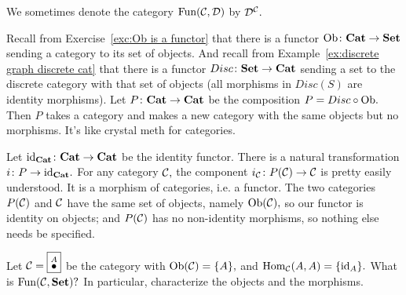 \documentclass[CT4S-EN-RU]{subfiles}
\begin{document}
\begin{proofRUS}
\end{proofRUS}

\begin{notationENG}
We sometimes denote the category $\textnormal{Fun}(\mathcal{C},\mathcal{D})$ by $\mathcal{D}^\mathcal{C}.$ 
\end{notationENG}

\begin{notationRUS}
\end{notationRUS}

\begin{exampleENG}
Recall from Exercise~\ref{exc:Ob is a functor} that there is a functor $\textnormal{Ob}\colon{\mathbf{Cat}}\rightarrow{\mathbf{Set}}$ sending a category to its set of objects. And recall from Example~\ref{ex:discrete graph discrete cat} that there is a functor $Disc\colon{\mathbf{Set}}\rightarrow{\mathbf{Cat}}$ sending a set to the discrete category with that set of objects (all morphisms in $Disc(S)$ are identity morphisms). Let $P\colon{\mathbf{Cat}}\rightarrow{\mathbf{Cat}}$ be the composition $P=Disc\circ\textnormal{Ob}.$ Then $P$ takes a category and makes a new category with the same objects but no morphisms. It's like crystal meth for categories.

Let $\textnormal{id}_{\mathbf{Cat}}\colon{\mathbf{Cat}}\rightarrow{\mathbf{Cat}}$ be the identity functor. There is a natural transformation $i\colon P\rightarrow\textnormal{id}_{\mathbf{Cat}}.$ For any category $\mathcal{C},$ the component $i_\mathcal{C}\colon P(\mathcal{C})\rightarrow\mathcal{C}$ is pretty easily understood. It is a morphism of categories, i.e. a functor. The two categories $P(\mathcal{C})$ and $\mathcal{C}$ have the same set of objects, namely $\textnormal{Ob}(\mathcal{C}),$ so our functor is identity on objects; and $P(\mathcal{C})$ has no non-identity morphisms, so nothing else needs be specified.
\end{exampleENG}

\begin{exampleRUS}
\end{exampleRUS}

\begin{exerciseENG}
Let $\mathcal{C}=\fbox{$\stackrel{A}{\bullet}$}$ be the category with $\textnormal{Ob}(\mathcal{C})=\{A\},$ and $\textnormal{Hom}_\mathcal{C}(A,A)=\{\textnormal{id}_A\}.$ What is $\textnormal{Fun}(\mathcal{C},{\mathbf{Set}})?$ In particular, characterize the objects and the morphisms.
\end{exerciseENG}

\begin{exerciseRUS}
\end{exerciseRUS}
\end{document}
